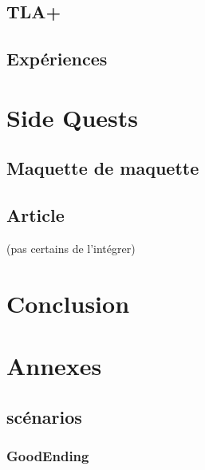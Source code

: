 \documentclass[oneside, a4paper, 11pt]{book}
\begin{document}
\section{TLA+}
\label{sec:tla}
\section{Expériences}
\label{sec:experiences}





\chapter{Side Quests}
\label{sec:sidequests}

\section{Maquette de maquette}
\section{Article}
(pas certains de l'intégrer)




\chapter{Conclusion}





\appendix

\chapter{Annexes}
\section{scénarios}
\subsection{GoodEnding}
\label{scenar:goodEnding}

\backmatter
%
%
\printindex
\end{document}
